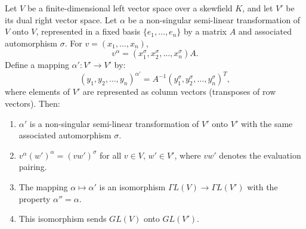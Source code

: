 Let $V$ be a finite-dimensional left vector space over a skewfield $K$, and let $V'$ be its dual right vector space. Let $\alpha$ be a non-singular semi-linear transformation of $V$ onto $V$, represented in a fixed basis $\{e_1, \dots, e_n\}$ by a matrix $A$ and associated automorphism $\sigma$. For $v = (x_1, \dots, x_n)$,
$$v^\alpha = (x_1^\sigma, x_2^\sigma, \dots, x_n^\sigma) A.$$
Define a mapping $\alpha' \colon V' \to V'$ by:
$$(y_1, y_2, \dots, y_n)^{\alpha'} = A^{-1} (y_1^\sigma, y_2^\sigma, \dots, y_n^\sigma)^T,$$
where elements of $V'$ are represented as column vectors (transposes of row vectors). Then:
\begin{enumerate}
\item $\alpha'$ is a non-singular semi-linear transformation of $V'$ onto $V'$ with the same associated automorphism $\sigma$.
\item $v^\alpha(w')^\alpha = (v w')^\sigma$ for all $v \in V$, $w' \in V'$, where $v w'$ denotes the evaluation pairing.
\item The mapping $\alpha \mapsto \alpha'$ is an isomorphism $\Gamma L(V) \to \Gamma L(V')$ with the property $\alpha'' = \alpha$.
\item This isomorphism sends $GL(V)$ onto $GL(V')$.
\end{enumerate}
